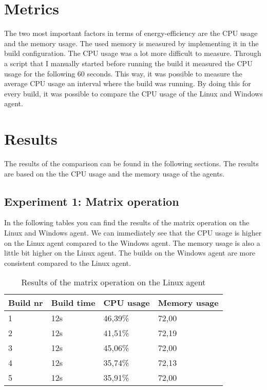 \section{Metrics}
The two most important factors in terms of energy-efficiency are the CPU usage and the memory usage. The used memory is measured by implementing it in the build configuration. The CPU usage was a lot more difficult to measure. Through a script that I manually started before running the build it measured the CPU usage for the following 60 seconds. This way, it was possible to measure the average CPU usage an interval where the build was running. By doing this for every build, it was possible to compare the CPU usage of the Linux and Windows agent.

\section{Results}
The results of the comparison can be found in the following sections. The results are based on the the CPU usage and the memory usage of the agents.

\subsection{Experiment 1: Matrix operation}
In the following tables you can find the results of the matrix operation on the Linux and Windows agent. We can immediately see that the CPU usage is higher on the Linux agent compared to the Windows agent. The memory usage is also a little bit higher on the Linux agent. The builds on the Windows agent are more consistent compared to the Linux agent.
\begin{table}[H]
\centering
\begin{tabular}{|l|l|l|l|}
\hline
Build nr & Build time & CPU usage & Memory usage \\ \hline
1        & 12s        & 46,39\%   & 72,00       \\ \hline
2        & 12s        & 41,51\%   & 72,19       \\ \hline
3        & 12s        & 45,06\%   & 72,00       \\ \hline
4        & 12s        & 35,74\%   & 72,13       \\ \hline
5        & 12s        & 35,91\%   & 72,00       \\ \hline
\end{tabular}
\caption{Results of the matrix operation on the Linux agent}
\end{table}

